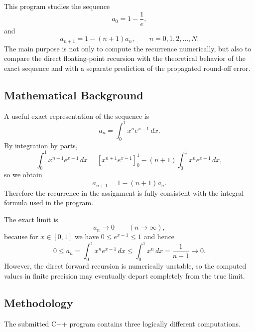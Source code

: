 \documentclass[12pt,a4paper]{article}
\begin{document}
This program studies the sequence
\begin{equation}
    a_0 = 1 - \frac{1}{e},
\end{equation}
and
\begin{equation}
    a_{n+1} = 1 - (n+1)a_n, \qquad n = 0,1,2,\dots,N.
\end{equation}
The main purpose is not only to compute the recurrence numerically, but also to compare the direct floating-point recursion with the theoretical behavior of the exact sequence and with a separate prediction of the propagated round-off error.

\subsection*{Mathematical Background}

A useful exact representation of the sequence is
\begin{equation}
    a_n = \int_0^1 x^n e^{x-1} \, dx.
\end{equation}
By integration by parts,
\begin{equation}
    \int_0^1 x^{n+1} e^{x-1} \, dx
    = \left[x^{n+1} e^{x-1}\right]_0^1 - (n+1)\int_0^1 x^n e^{x-1} \, dx,
\end{equation}
so we obtain
\begin{equation}
    a_{n+1} = 1 - (n+1)a_n.
\end{equation}
Therefore the recurrence in the assignment is fully consistent with the integral formula used in the program.

The exact limit is
\begin{equation}
    a_n \to 0 \qquad (n \to \infty),
\end{equation}
because for $x \in [0,1]$ we have $0 \le e^{x-1} \le 1$ and hence
\begin{equation}
    0 \le a_n = \int_0^1 x^n e^{x-1} \, dx \le \int_0^1 x^n \, dx = \frac{1}{n+1} \to 0.
\end{equation}
However, the direct forward recursion is numerically unstable, so the computed values in finite precision may eventually depart completely from the true limit.

\subsection*{Methodology}

The submitted C++ program contains three logically different computations.
\end{document}
